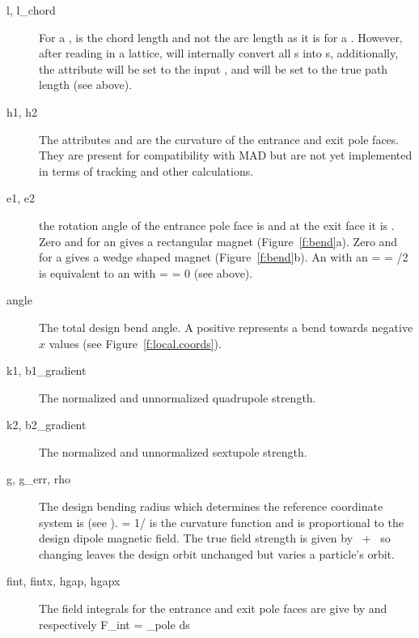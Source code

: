   \begin{description}
  \item[l, l_chord]  \Newline
For a ,  is the chord length and not the arc length as
it is for a .  However, after reading in a lattice, \bmad will
internally convert all s into s, additionally, the
 attribute will be set to the input , and  
will be set to the true path length (see above).
  \item[h1, h2] \Newline
The attributes  and  are the curvature of the entrance
and exit pole faces. They are present for compatibility with MAD but
are not yet implemented in terms of tracking and other calculations.
  \item[e1, e2] \Newline
the rotation angle of the entrance pole face is  and at the
exit face it is . Zero  and  for an 
gives a rectangular magnet  (Figure~\ref{f:bend}a). Zero  and 
for a  gives a wedge shaped magnet (Figure~\ref{f:bend}b).
An  with an  =  =
/2 is equivalent to an  with  =  =
0 (see above).
  \item[angle] \Newline
The total design bend angle. A positive  represents a
bend towards negative $x$ values (see Figure~\ref{f:local.coords}).
  \item[k1, b1_gradient] \Newline
The normalized and unnormalized quadrupole strength.
  \item[k2, b2_gradient] \Newline
The normalized and unnormalized sextupole strength. 
  \item[g, g_err, rho] \Newline
The design bending radius which determines the reference coordinate
system is  (see ).  = 1/ is
the curvature function and is proportional to the design dipole
magnetic field. The true field strength is given by
~+~ so changing  leaves the design orbit
unchanged but varies a particle's orbit.
  \item[fint, fintx, \Newline hgap, hgapx] \Newline
The field integrals for the entrance and
exit pole faces are give by  and  respectively
\Begineq
  F_{int} = \int_{pole} \! \! ds \, 

\end{description}
